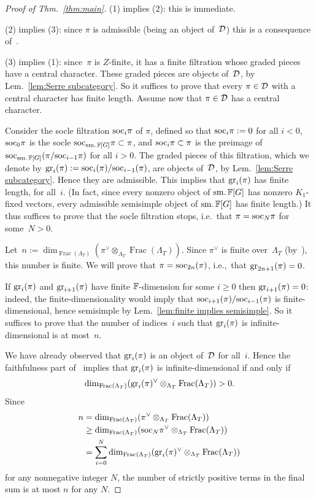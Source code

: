 \documentclass[oneside,a4paper,english, 11pt]{amsart}
\newcommand{\Frac}{\operatorname{Frac}}
\begin{document}
\begin{proof}[Proof of Thm.\ \emph{\ref{thm:main}}]
    (1) implies (2): this is immediate.

    (2) implies (3): since $\pi$ is admissible (being an object of~$\mathcal{D}$) this is a consequence of~\cite[Lem.\ 2.3.5]{emerton-ordI}.

    (3) implies (1): since~$\pi$ is $Z$-finite, it has a finite filtration whose graded pieces have a central character.
    These graded pieces are objects of~$\mathcal{D}$, by Lem.\ \ref{lem:Serre subcategory}.
    So it suffices to prove that every $\pi \in \mathcal{D}$ with a central character has finite length. 
Assume now that $\pi \in \mathcal{D}$ has a central character. 

    Consider the socle filtration $\mathrm{soc}_i \pi$ of $\pi$, defined so that $\mathrm{soc}_i \pi := 0$ for all $i<0$, 
    $\mathrm{soc}_0 \pi$ is the socle $\mathrm{soc}_{\operatorname{sm.} \mathbb{F}[G]} \pi \subset \pi$, and $\mathrm{soc}_i \pi \subset \pi$ is the preimage of $\mathrm{soc}_{\operatorname{sm.} \mathbb{F}[G]} (\pi/\mathrm{soc}_{i-1}\pi)$ 
    for all $i>0$.  
    The graded pieces of this filtration, which we denote by $\operatorname{gr}_i(\pi) := \mathrm{soc}_i(\pi)/\mathrm{soc}_{i-1}(\pi)$, are objects of~$\mathcal{D}$, 
    by Lem.\ \ref{lem:Serre subcategory}. 
    Hence they are admissible.
    This implies that $\operatorname{gr}_i(\pi)$ has finite length, for all~$i$.
    (In fact, since every nonzero object of $\operatorname{sm.} \mathbb{F}[G]$ has nonzero $K_1$-fixed vectors, 
    every admissible semisimple object of $\operatorname{sm.} \mathbb{F}[G]$ has finite length.)
    It thus suffices to prove that the socle filtration stops, i.e.\ that $\pi = \mathrm{soc}_N \pi$ for some~$N > 0$. 

    Let~$n := \dim_{\Frac(\Lambda_T)}(\pi^\vee \otimes_{\Lambda_T} \Frac(\Lambda_T))$.
    Since $\pi^\vee$ is finite over~$\Lambda_T$ (by~\cite[Thm.\ 1.1]{Zhao}), this number is finite.
    We will prove that $\pi = \mathrm{soc}_{2n}(\pi)$, i.e.,~that $\operatorname{gr}_{2n+1}(\pi) = 0$.

    If $\operatorname{gr}_i(\pi)$ and $\operatorname{gr}_{i+1}(\pi)$ have finite $\mathbb{F}$-dimension for some $i\geq 0$ then $\operatorname{gr}_{i+1}(\pi) = 0$:
    indeed, the finite-dimensionality would imply that $\mathrm{soc}_{i+1}(\pi)/ \mathrm{soc}_{i-1} (\pi)$ is finite-dimensional, hence semisimple by Lem.\ \ref{lem:finite implies semisimple}.
    So it suffices to prove that the number of indices~$i$ such that $\operatorname{gr}_i(\pi)$ is infinite-dimensional is at most~$n$.

    We have already observed that $\operatorname{gr}_i(\pi)$ is an object of~$\mathcal{D}$ for all~$i$. 
    Hence the faithfulness part of~\cite[Thm.\ 1.1]{Zhao} implies that $\operatorname{gr}_i(\pi)$ is infinite-dimensional if and only if
    \[\dim_{\Frac(\Lambda_T)}(\gr_i(\pi)^\vee \otimes_{\Lambda_T} \Frac(\Lambda_T)) > 0.\]
    Since 
    \begin{align*}
n&=\dim_{\Frac(\Lambda_T)}(\pi^\vee \otimes_{\Lambda_T} \Frac(\Lambda_T)) \\
&\geq \dim_{\Frac(\Lambda_T)}(\soc_N\pi^\vee \otimes_{\Lambda_T} \Frac(\Lambda_T)) \\
&= \sum_{i=0}^N \dim_{\Frac(\Lambda_T)}(\gr_i(\pi)^\vee \otimes_{\Lambda_T} \Frac(\Lambda_T))\end{align*}
for any nonnegative integer $N$, the number of strictly positive terms in the final sum is at most $n$ for any $N$. 
\end{proof}



\end{document}
